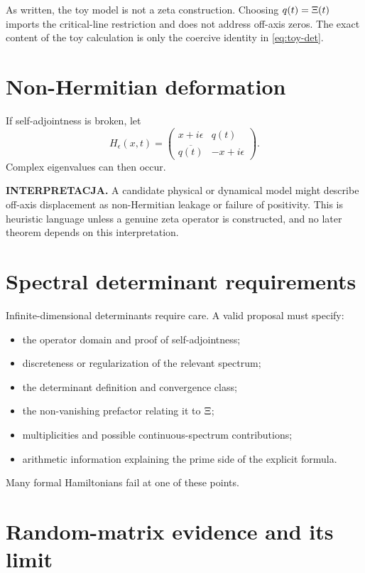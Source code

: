 As written, the toy model is not a zeta construction. Choosing $q(t)=\Xi(t)$ imports the critical-line restriction and does not address off-axis zeros. The exact content of the toy calculation is only the coercive identity in \cref{eq:toy-det}.

\section{Non-Hermitian deformation}

If self-adjointness is broken, let
\[
 H_\epsilon(x,t)=
 \begin{pmatrix}
  x+i\epsilon & q(t)\\
  \overline{q(t)} & -x+i\epsilon
 \end{pmatrix}.
\]
Complex eigenvalues can then occur.

\textbf{INTERPRETACJA.} A candidate physical or dynamical model might describe off-axis displacement as non-Hermitian leakage or failure of positivity. This is heuristic language unless a genuine zeta operator is constructed, and no later theorem depends on this interpretation.

\section{Spectral determinant requirements}

Infinite-dimensional determinants require care. A valid proposal must specify:
\begin{itemize}
  \item the operator domain and proof of self-adjointness;
  \item discreteness or regularization of the relevant spectrum;
  \item the determinant definition and convergence class;
  \item the non-vanishing prefactor relating it to $\Xi$;
  \item multiplicities and possible continuous-spectrum contributions;
  \item arithmetic information explaining the prime side of the explicit formula.
\end{itemize}
Many formal Hamiltonians fail at one of these points.

\section{Random-matrix evidence and its limit}

